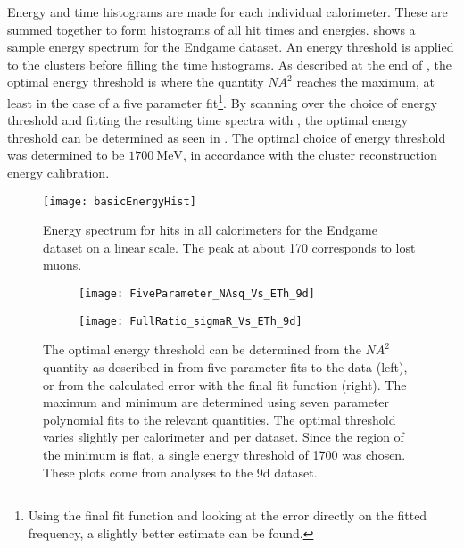 Energy and time histograms are made for each individual calorimeter. These are summed together to form histograms of all hit times and energies.  shows a sample energy spectrum for the Endgame dataset. An energy threshold is applied to the clusters before filling the time histograms. As described at the end of , the optimal energy threshold is where the quantity $NA^{2}$ reaches the maximum, at least in the case of a five parameter fit\footnote{Using the final fit function and looking at the error directly on the fitted \wa frequency, a slightly better estimate can be found.}. By scanning over the choice of energy threshold and fitting the resulting time spectra with , the optimal energy threshold can be determined as seen in . The optimal choice of energy threshold was determined to be $\SI{1700}{\MeV}$, in accordance with the cluster reconstruction energy calibration. 

\begin{figure}[]
    \centering
    \texttt{[image: basicEnergyHist]}
    \caption[Sample energy spectrum]{Energy spectrum for hits in all calorimeters for the Endgame dataset on a linear scale. The peak at about 170 \MeV corresponds to lost muons.}
    \label{fig:energyHist}
\end{figure}


    \begin{figure}[]
    \centering
        \begin{subfigure}[t]{0.45\textwidth}
            \centering
            \texttt{[image: FiveParameter\_NAsq\_Vs\_ETh\_9d]}
            \caption{}
        \end{subfigure}
        \begin{subfigure}[t]{0.45\textwidth}
            \centering
            \texttt{[image: FullRatio\_sigmaR\_Vs\_ETh\_9d]}
            \caption{}
        \end{subfigure}%
    \caption[Determination of optimal energy threshold]{The optimal energy threshold can be determined from the $NA^{2}$ quantity as described in  from five parameter fits to the data (left), or from the calculated error with the final fit function (right). The maximum and minimum are determined using seven parameter polynomial fits to the relevant quantities. The optimal threshold varies slightly per calorimeter and per dataset. Since the region of the minimum is flat, a single energy threshold of 1700 \MeV was chosen. These plots come from analyses to the 9d dataset.}
    \label{fig:OptimalEnergyThreshold}
    \end{figure}


